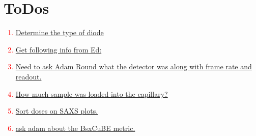 \chapter{ToDos}
\textcolor{red}{
    \begin{enumerate}
        \item \hyperlink{todo:Type of diode}{Determine the type of diode}
        \item \hyperlink{todo:Need info from Ed}{Get following info from Ed:}
        \item \hyperlink{todo:Detector type}{Need to ask Adam Round what the detector was along with frame rate and readout.}
        \item \hyperlink{todo:Detector type}{How much sample was loaded into the capillary?}
        \item \hyperlink{todo:SortDoses}{Sort doses on SAXS plots.}
        \item \hyperlink{todo:Ask Adam about BsxCuBE}{ask adam about the BsxCuBE metric.}
    \end{enumerate}
}
